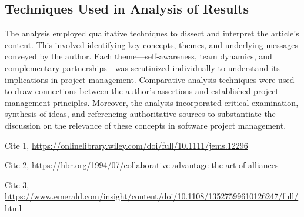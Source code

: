 \documentclass[runningheads]{llncs}
\begin{document}
\subsection{Techniques Used in Analysis of Results}
The analysis employed qualitative techniques to dissect and interpret the article's content. This involved identifying key concepts, themes, and underlying messages conveyed by the author. Each theme—self-awareness, team dynamics, and complementary partnerships—was scrutinized individually to understand its implications in project management. Comparative analysis techniques were used to draw connections between the author's assertions and established project management principles. Moreover, the analysis incorporated critical examination, synthesis of ideas, and referencing authoritative sources to substantiate the discussion on the relevance of these concepts in software project management.
%
%
%
% 
% 
%
\begin{thebibliography}{8}


Cite 1, \url{https://onlinelibrary.wiley.com/doi/full/10.1111/jems.12296}

Cite 2, \url{https://hbr.org/1994/07/collaborative-advantage-the-art-of-alliances}

Cite 3, \url{https://www.emerald.com/insight/content/doi/10.1108/13527599610126247/full/html}
\end{thebibliography}
\end{document}
